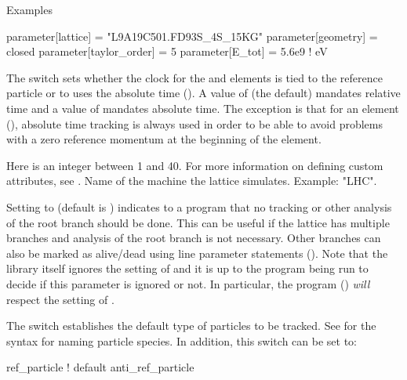 \noindent
Examples
\begin{example}
  parameter[lattice]      = "L9A19C501.FD93S_4S_15KG"
  parameter[geometry]     = closed
  parameter[taylor_order] = 5
  parameter[E_tot]        = 5.6e9    ! eV
\end{example}

  \begin{description}
%
  \item[{parameter[absolute_time_tracking]}] \Newline
The  switch sets whether the clock for the  and
 elements is tied to the reference particle or to uses the absolute time
(). A value of  (the default) mandates relative time and a value
of  mandates absolute time. The exception is that for an  element
(), absolute time tracking is always used in order to be able to avoid
problems with a zero reference momentum at the beginning of the element.
%
  \item[{parameter[custom_attributeN]}] \Newline
Here  is an integer between 1 and 40.
For more information on defining custom attributes, see .
%
Name of the machine the lattice simulates. Example: "LHC".
%
  \item[{parameter[live_branch]}] \Newline
Setting  to  (default is ) indicates to a program that no
tracking or other analysis of the root branch should be done. This can be useful if the lattice has
multiple branches and analysis of the root branch is not necessary. Other branches can also be
marked as alive/dead using line parameter statements (). Note that the \bmad
library itself ignores the setting of  and it is up to the program being run to
decide if this parameter is ignored or not. In particular, the \tao program ()
{\em will} respect the setting of .
%
  \item[{parameter[default_tracking_species]}] \Newline
The  switch establishes the default type of particles to be
tracked. See  for the syntax for naming particle species. In addition, this switch
can be set to:
\begin{example}
  ref_particle     ! default
  anti_ref_particle
\end{example}

\end{description}
